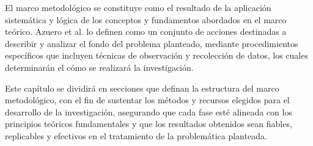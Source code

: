 El marco metodológico se constituye como el resultado de la aplicación sistemática y lógica de los conceptos y fundamentos abordados en el marco teórico. Azuero et al. \cite{azuero_2019} lo definen como un conjunto de acciones destinadas a describir y analizar el fondo del problema planteado, mediante procedimientos específicos que incluyen técnicas de observación y recolección de datos, los cuales determinarán el cómo se realizará la investigación. 

Este capítulo se dividirá en secciones que definan la estructura del marco metodológico, con el fin de sustentar los métodos y recursos elegidos para el desarrollo de la investigación, asegurando que cada fase esté alineada con los principios teóricos fundamentales y que los resultados obtenidos sean fiables, replicables y efectivos en el tratamiento de la problemática planteada.